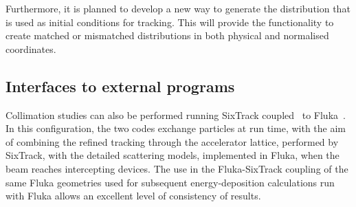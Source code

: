 \documentclass{ws-ijmpa}
\begin{document}
Furthermore, it is planned to develop a new way to generate the distribution that is used as initial conditions for tracking. This will provide the functionality to create matched or mismatched distributions in both physical and normalised coordinates.

\subsection{Interfaces to external programs}

Collimation studies can also be performed running SixTrack coupled~\cite{flukaCouplingVV} to Fluka~\cite{FLUKA1,FLUKA2}. In this configuration, the two codes exchange particles at run time, with the aim of combining the refined tracking through the accelerator lattice, performed by SixTrack, with the detailed scattering models, implemented in Fluka, when the beam reaches intercepting devices. The use in the Fluka-SixTrack coupling of the same Fluka geometries used for subsequent energy-deposition calculations run with Fluka allows an excellent level of consistency of results.
\end{document}
